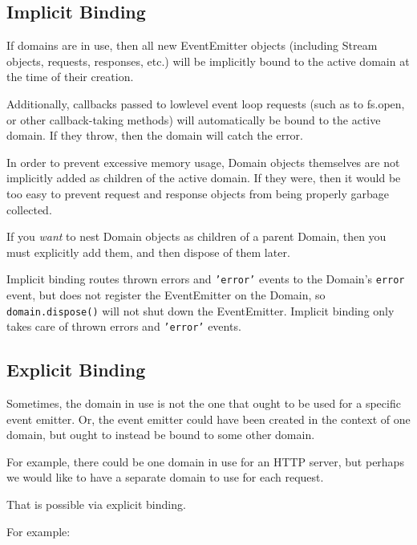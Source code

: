 \subsection{Implicit Binding}

If domains are in use, then all new EventEmitter objects (including
Stream objects, requests, responses, etc.) will be implicitly bound to
the active domain at the time of their creation.

Additionally, callbacks passed to lowlevel event loop requests (such as
to fs.open, or other callback-taking methods) will automatically be
bound to the active domain. If they throw, then the domain will catch
the error.

In order to prevent excessive memory usage, Domain objects themselves
are not implicitly added as children of the active domain. If they were,
then it would be too easy to prevent request and response objects from
being properly garbage collected.

If you \emph{want} to nest Domain objects as children of a parent
Domain, then you must explicitly add them, and then dispose of them
later.

Implicit binding routes thrown errors and \texttt{'error'} events to the
Domain's \texttt{error} event, but does not register the EventEmitter on
the Domain, so \texttt{domain.dispose()} will not shut down the
EventEmitter. Implicit binding only takes care of thrown errors and
\texttt{'error'} events.

\subsection{Explicit Binding}

Sometimes, the domain in use is not the one that ought to be used for a
specific event emitter. Or, the event emitter could have been created in
the context of one domain, but ought to instead be bound to some other
domain.

For example, there could be one domain in use for an HTTP server, but
perhaps we would like to have a separate domain to use for each request.

That is possible via explicit binding.

For example:

